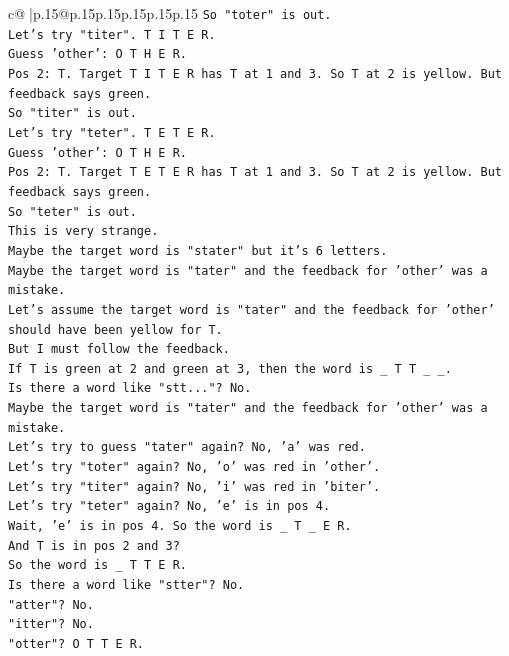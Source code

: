 \documentclass{article}
\begin{document}
{\begin{supertabular}{c@{$\;$}|p{.15\linewidth}@{}p{.15\linewidth}p{.15\linewidth}p{.15\linewidth}p{.15\linewidth}p{.15\linewidth}}
{{{\texttt{So "toter" is out.} \\
\texttt{Let's try "titer". T I T E R.} \\
\texttt{Guess 'other': O T H E R.} \\
\texttt{Pos 2: T. Target T I T E R has T at 1 and 3. So T at 2 is yellow. But feedback says green.} \\
\texttt{So "titer" is out.} \\
\texttt{Let's try "teter". T E T E R.} \\
\texttt{Guess 'other': O T H E R.} \\
\texttt{Pos 2: T. Target T E T E R has T at 1 and 3. So T at 2 is yellow. But feedback says green.} \\
\texttt{So "teter" is out.} \\
\texttt{This is very strange.} \\
\texttt{Maybe the target word is "stater" but it's 6 letters.} \\
\texttt{Maybe the target word is "tater" and the feedback for 'other' was a mistake.} \\
\texttt{Let's assume the target word is "tater" and the feedback for 'other' should have been yellow for T.} \\
\texttt{But I must follow the feedback.} \\
\texttt{If T is green at 2 and green at 3, then the word is \_ T T \_ \_.} \\
\texttt{Is there a word like "stt..."? No.} \\
\texttt{Maybe the target word is "tater" and the feedback for 'other' was a mistake.} \\
\texttt{Let's try to guess "tater" again? No, 'a' was red.} \\
\texttt{Let's try "toter" again? No, 'o' was red in 'other'.} \\
\texttt{Let's try "titer" again? No, 'i' was red in 'biter'.} \\
\texttt{Let's try "teter" again? No, 'e' is in pos 4.} \\
\texttt{Wait, 'e' is in pos 4. So the word is \_ T \_ E R.} \\
\texttt{And T is in pos 2 and 3?} \\
\texttt{So the word is \_ T T E R.} \\
\texttt{Is there a word like "stter"? No.} \\
\texttt{"atter"? No.} \\
\texttt{"itter"? No.} \\
\texttt{"otter"? O T T E R.} \\
}}}
\end{supertabular}}
\end{document}

